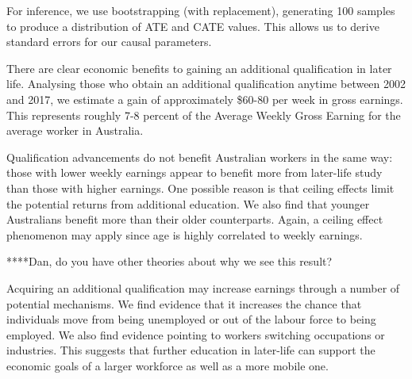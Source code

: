 \documentclass[12pt, a4paper]{article}
\begin{document}
For inference, we use bootstrapping (with replacement), generating 100 samples to produce a distribution of ATE and CATE values. This allows us to derive standard errors for our causal parameters.

There are clear economic benefits to gaining an additional qualification in later life. Analysing those who obtain an additional qualification anytime between 2002 and 2017, we estimate a gain of approximately \$60-80 per week in gross earnings. This represents roughly 7-8 percent of the Average Weekly Gross Earning for the average worker in Australia.


Qualification advancements do not benefit Australian workers in the same way: those with lower weekly earnings appear to benefit more from later-life study than those with higher earnings. One possible reason is that ceiling effects limit the potential returns from additional education. We also find that younger Australians benefit more than their older counterparts. Again, a ceiling effect phenomenon may apply since age is highly correlated to weekly earnings. 

****Dan, do you have other theories about why we see this result? 

Acquiring an additional qualification may increase earnings through a number of potential mechanisms. We find evidence that it increases the chance that individuals move from being unemployed or out of the labour force to being employed. We also find evidence pointing to workers switching occupations or industries. This suggests that further education in later-life can support the economic goals of a larger workforce as well as a more mobile one.


\end{document}
